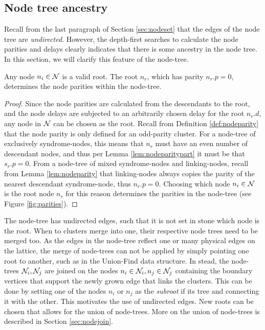 
\subsection{Node tree ancestry}


Recall from the last paragraph of Section \ref{sec:nodeset} that the edges of the node tree are \emph{undirected}. However, the depth-first searches to calculate the node parities and delays clearly indicates that there is some ancestry in the node tree. In this section, we will clarify this feature of the node-tree. 
\begin{lemma}\label{lem:anynoderoot}
  Any node $n_i \in \mathcal{N}$ is a valid root. The root $n_r$, which has parity $n_r.p=0$, determines the node parities within the node-tree. 
\end{lemma}
\begin{proof}
  Since the node parities are calculated from the descendants to the root, and the node delays are subjected to an arbitrarily chosen delay for the root $n_r.d$, any node in $\mathcal{N}$ can be chosen as the root. Recall from Definition \ref{def:nodeparity} that the node parity is only defined for an odd-parity cluster. For a node-tree of exclusively syndrome-nodes, this means that $n_r$ must have an even number of descendant nodes, and thus per Lemma \ref{lem:nodeparitypart} it must be that $s_r.p=0$. From a node-tree of mixed syndrome-nodes and linking-nodes, recall from Lemma \ref{lem:nodeparity} that linking-nodes always copies the parity of the nearest descendant syndrome-node, thus $n_r.p=0$. Choosing which node $n_i \in \mathcal{N}$ is the root node $n_r$ for this reason determines the parities in the node-tree (see Figure \ref{fig:parities}). 
\end{proof}

The node-tree has undirected edges, such that it is not set in stone which node is the root. When to clusters merge into one, their respective node trees need to be merged too. As the edges in the node-tree reflect one or many physical edges on the lattice, the merge of node-trees can not be applied by simply pointing one root to another, such as in the Union-Find data structure. In stead, the node-trees $\mathcal{N}_i, \mathcal{N}_j$ are joined on the nodes $n_i \in \mathcal{N}_i, n_j\in \mathcal{N}_j$ containing the boundary vertices that support the newly grown edge that links the clusters. This can be done by setting one of the nodes $n_i$ or $n_j$ as the \emph{subroot} if its tree and connecting it with the other. This motivates the use of undirected edges. New roots can be chosen that allows for the union of node-trees. More on the union of node-trees is described in Section \ref{sec:nodejoin}. 

